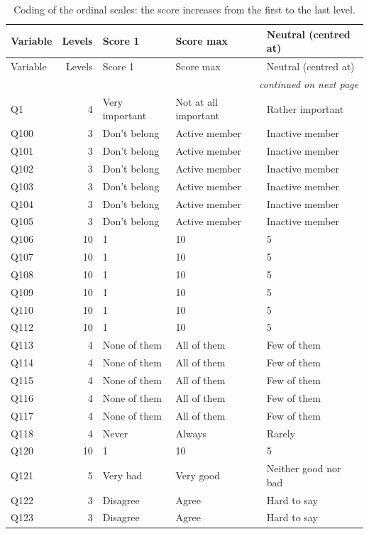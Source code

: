 \begingroup\footnotesize
\begin{longtable}{l r l l l}
\caption{Coding of the ordinal scales: the score increases from the first to the last level.}\label{tab:ordinal-scales}\\
\toprule
Variable & Levels & Score 1 & Score max & Neutral (centred at) \\
\midrule \endfirsthead
\toprule
Variable & Levels & Score 1 & Score max & Neutral (centred at) \\
\midrule \endhead
\midrule \multicolumn{5}{r}{\emph{continued on next page}}\\ \endfoot
\bottomrule \endlastfoot
Q1 & 4 & Very important & Not at all important & Rather important \\
Q100 & 3 & Don't belong & Active member & Inactive member \\
Q101 & 3 & Don't belong & Active member & Inactive member \\
Q102 & 3 & Don't belong & Active member & Inactive member \\
Q103 & 3 & Don't belong & Active member & Inactive member \\
Q104 & 3 & Don't belong & Active member & Inactive member \\
Q105 & 3 & Don't belong & Active member & Inactive member \\
Q106 & 10 & 1 & 10 & 5 \\
Q107 & 10 & 1 & 10 & 5 \\
Q108 & 10 & 1 & 10 & 5 \\
Q109 & 10 & 1 & 10 & 5 \\
Q110 & 10 & 1 & 10 & 5 \\
Q112 & 10 & 1 & 10 & 5 \\
Q113 & 4 & None of them & All of them & Few of them \\
Q114 & 4 & None of them & All of them & Few of them \\
Q115 & 4 & None of them & All of them & Few of them \\
Q116 & 4 & None of them & All of them & Few of them \\
Q117 & 4 & None of them & All of them & Few of them \\
Q118 & 4 & Never & Always & Rarely \\
Q120 & 10 & 1 & 10 & 5 \\
Q121 & 5 & Very bad & Very good & Neither good nor bad \\
Q122 & 3 & Disagree & Agree & Hard to say \\
Q123 & 3 & Disagree & Agree & Hard to say \\

\end{longtable}
